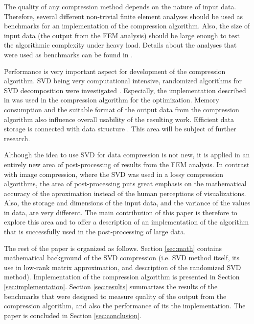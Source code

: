 The quality of any compression method depends on the nature of input data. Therefore, several different non-trivial finite element analyses should be used as benchmarks for an implementation of the compression algorithm. Also, the size of input data (the output from the FEM analysis) should be large enough to test the algorithmic complexity under heavy load. Details about the analyses that were used as benchmarks can be found in \cite{Kruis2012, Koudelka2009, Koudelka2006, Kruis2005}.

Performance is very important aspect for development of the compression algorithm. SVD being very computational intensive, randomized algorithms for SVD decomposition were investigated \cite{Candes2011, Woolfe2008, Martinsson2011, Szlam2014}. Especially, the implementation described in \cite{Halko2011} was used in the compression algorithm for the optimization. Memory consumption and the suitable format of the output data from the compression algorithm also influence overall usability of the resulting work. Efficient data storage is connected with data structure \cite{Ivanyi2012, Ivanyi2014}. This area will be subject of further research.

Although the idea to use SVD for data compression is not new, it is applied in an entirely new area of post-processing of results from the FEM analysis. In contrast with image compression, where the SVD was used in a lossy compression algorithms, the area of post-processing puts great emphasis on the mathematical accuracy of the aproximation instead of the human perceptions of visualizations. Also, the storage and dimensions of the input data, and the variance of the values in data, are very different. The main contribution of this paper is therefore to explore this area and to offer a description of an implementation of the algorithm that is successfully used in the post-processing of large data.

The rest of the paper is organized as follows. Section \ref{sec:math} contains mathematical background of the SVD compression (i.e. SVD method itself, its use in low-rank matrix approximation, and description of the randomized SVD method). Implementation of the compression algorithm is presented in Section \ref{sec:implementation}. Section \ref{sec:results} summarizes the results of the benchmarks that were designed to measure quality of the output from the compression algorithm, and also the performance of its the implementation. The paper is concluded in Section \ref{sec:conclusion}.
